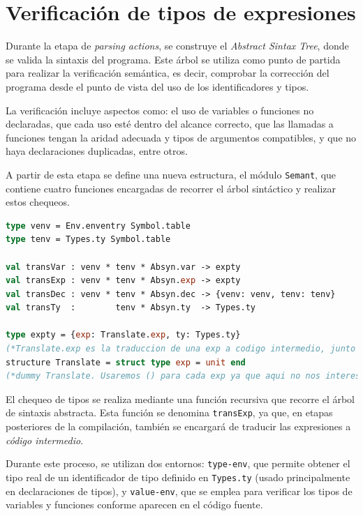 \documentclass[runningheads]{llncs}
\begin{document}
\section{Verificación de tipos de expresiones}
Durante la etapa de \textit{parsing actions}, se construye el \textit{Abstract Sintax Tree}, donde se valida la sintaxis del programa. Este árbol se utiliza como punto de partida para realizar la verificación semántica, es decir, comprobar la corrección del programa desde el punto de vista del uso de los identificadores y tipos.

La verificación incluye aspectos como: el uso de variables o funciones no declaradas, que cada uso esté dentro del alcance correcto, que las llamadas a funciones tengan la aridad adecuada y tipos de argumentos compatibles, y que no haya declaraciones duplicadas, entre otros.

A partir de esta etapa se define una nueva estructura, el módulo \texttt{Semant}, que contiene cuatro funciones encargadas de recorrer el árbol sintáctico y realizar estos chequeos.

\begin{lstlisting}[language=ML, caption={Corrección de tipos dentro del módulo Semant}, captionpos=b]
type venv = Env.enventry Symbol.table
type tenv = Types.ty Symbol.table

val transVar : venv * tenv * Absyn.var -> expty
val transExp : venv * tenv * Absyn.exp -> expty
val transDec : venv * tenv * Absyn.dec -> {venv: venv, tenv: tenv}
val transTy  :        tenv * Absyn.ty  -> Types.ty

type expty = {exp: Translate.exp, ty: Types.ty}
(*Translate.exp es la traduccion de una exp a codigo intermedio, junto a su tipo Tiger asociado*)
structure Translate = struct type exp = unit end
(*dummy Translate. Usaremos () para cada exp ya que aqui no nos interesa esa parte*)
\end{lstlisting}

El chequeo de tipos se realiza mediante una función recursiva que recorre el árbol de sintaxis abstracta. Esta función se denomina \texttt{transExp}, ya que, en etapas posteriores de la compilación, también se encargará de traducir las expresiones a \textit{código intermedio}.

Durante este proceso, se utilizan dos entornos: \texttt{type-env}, que permite obtener el tipo real de un identificador de tipo definido en \texttt{Types.ty} (usado principalmente en declaraciones de tipos), y \texttt{value-env}, que se emplea para verificar los tipos de variables y funciones conforme aparecen en el código fuente.
\end{document}

